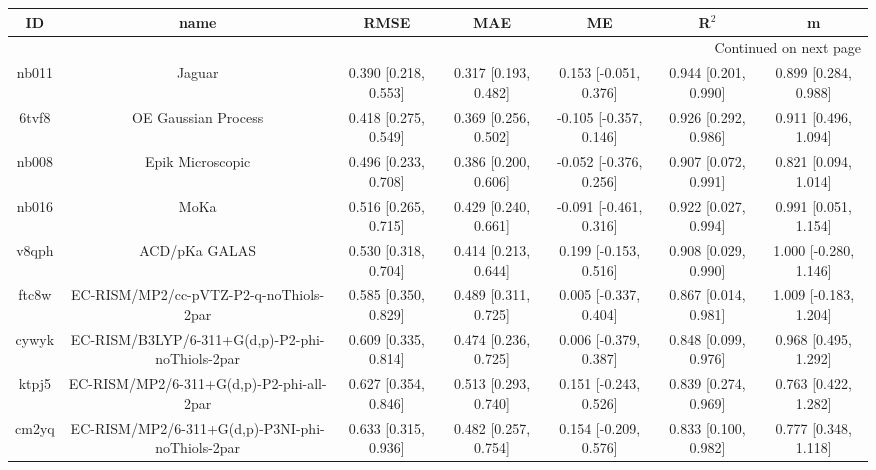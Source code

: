 \documentclass{article}
\begin{document}
\begin{center}
\begin{longtable}{|ccccccc|}
\toprule
    ID &                                               name &                   RMSE &                   MAE &                       ME &                 R$^2$ &                      m \\
\midrule
\endhead
\midrule
\multicolumn{7}{r}{{Continued on next page}} \\
\midrule
\endfoot

\bottomrule
\endlastfoot
 nb011 &                                             Jaguar &   0.390 [0.218, 0.553] &  0.317 [0.193, 0.482] &    0.153 [-0.051, 0.376] &  0.944 [0.201, 0.990] &   0.899 [0.284, 0.988] \\
 6tvf8 &                                OE Gaussian Process &   0.418 [0.275, 0.549] &  0.369 [0.256, 0.502] &   -0.105 [-0.357, 0.146] &  0.926 [0.292, 0.986] &   0.911 [0.496, 1.094] \\
 nb008 &                                   Epik Microscopic &   0.496 [0.233, 0.708] &  0.386 [0.200, 0.606] &   -0.052 [-0.376, 0.256] &  0.907 [0.072, 0.991] &   0.821 [0.094, 1.014] \\
 nb016 &                                               MoKa &   0.516 [0.265, 0.715] &  0.429 [0.240, 0.661] &   -0.091 [-0.461, 0.316] &  0.922 [0.027, 0.994] &   0.991 [0.051, 1.154] \\
 v8qph &                                      ACD/pKa GALAS &   0.530 [0.318, 0.704] &  0.414 [0.213, 0.644] &    0.199 [-0.153, 0.516] &  0.908 [0.029, 0.990] &  1.000 [-0.280, 1.146] \\
 ftc8w &             EC-RISM/MP2/cc-pVTZ-P2-q-noThiols-2par &   0.585 [0.350, 0.829] &  0.489 [0.311, 0.725] &    0.005 [-0.337, 0.404] &  0.867 [0.014, 0.981] &  1.009 [-0.183, 1.204] \\
 cywyk &    EC-RISM/B3LYP/6-311+G(d,p)-P2-phi-noThiols-2par &   0.609 [0.335, 0.814] &  0.474 [0.236, 0.725] &    0.006 [-0.379, 0.387] &  0.848 [0.099, 0.976] &   0.968 [0.495, 1.292] \\
 ktpj5 &           EC-RISM/MP2/6-311+G(d,p)-P2-phi-all-2par &   0.627 [0.354, 0.846] &  0.513 [0.293, 0.740] &    0.151 [-0.243, 0.526] &  0.839 [0.274, 0.969] &   0.763 [0.422, 1.282] \\
 cm2yq &    EC-RISM/MP2/6-311+G(d,p)-P3NI-phi-noThiols-2par &   0.633 [0.315, 0.936] &  0.482 [0.257, 0.754] &    0.154 [-0.209, 0.576] &  0.833 [0.100, 0.982] &   0.777 [0.348, 1.118] \\

\end{longtable}
\end{center}
\end{document}
